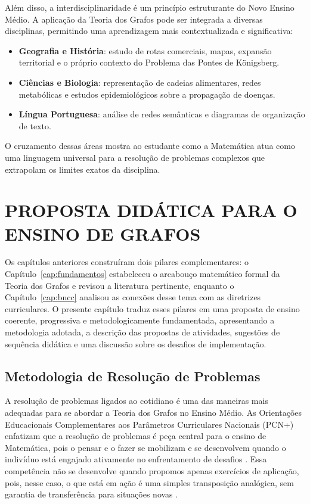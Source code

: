 \documentclass[
  12pt,
  oneside,
  a4paper,
  english,
  brazilian
  ]{abntex2}
\theoremstyle{definition}
\begin{document}
Além disso, a interdisciplinaridade é um princípio estruturante do Novo Ensino Médio. A aplicação da Teoria dos Grafos pode ser integrada a diversas disciplinas, permitindo uma aprendizagem mais contextualizada e significativa:

\begin{itemize}
  \item \textbf{Geografia e História}: estudo de rotas comerciais, mapas, expansão territorial e o próprio contexto do Problema das Pontes de Königsberg.
  \item \textbf{Ciências e Biologia}: representação de cadeias alimentares, redes metabólicas e estudos epidemiológicos sobre a propagação de doenças.
  \item \textbf{Língua Portuguesa}: análise de redes semânticas e diagramas de organização de texto.
\end{itemize}

O cruzamento dessas áreas mostra ao estudante como a Matemática atua como uma linguagem universal para a resolução de problemas complexos que extrapolam os limites exatos da disciplina.

\chapter{PROPOSTA DIDÁTICA PARA O ENSINO DE GRAFOS}
\label{cap:proposta}

Os capítulos anteriores construíram dois pilares complementares: o Capítulo~\ref{cap:fundamentos} estabeleceu o arcabouço matemático formal da Teoria dos Grafos e revisou a literatura pertinente, enquanto o Capítulo~\ref{cap:bncc} analisou as conexões desse tema com as diretrizes curriculares. O presente capítulo traduz esses pilares em uma proposta de ensino coerente, progressiva e metodologicamente fundamentada, apresentando a metodologia adotada, a descrição das propostas de atividades, sugestões de sequência didática e uma discussão sobre os desafios de implementação.

\section{Metodologia de Resolução de Problemas}
\label{sec:metodologia}

A resolução de problemas ligados ao cotidiano é uma das maneiras mais adequadas para se abordar a Teoria dos Grafos no Ensino Médio. As Orientações Educacionais Complementares aos Parâmetros Curriculares Nacionais (PCN+) enfatizam que a resolução de problemas é peça central para o ensino de Matemática, pois o pensar e o fazer se mobilizam e se desenvolvem quando o indivíduo está engajado ativamente no enfrentamento de desafios \cite{brasil2002}. Essa competência não se desenvolve quando propomos apenas exercícios de aplicação, pois, nesse caso, o que está em ação é uma simples transposição analógica, sem garantia de transferência para situações novas \cite{brasil2002}.
\end{document}
